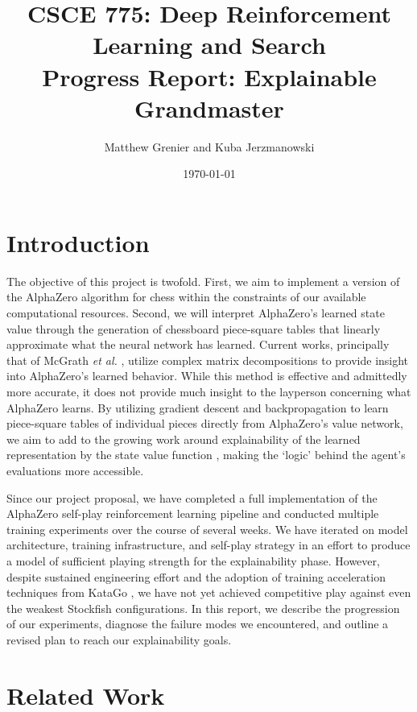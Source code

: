 \documentclass{article}
\title{CSCE 775: Deep Reinforcement Learning and Search \\
{\textbf{\large Progress Report: Explainable Grandmaster}}}
\author{Matthew Grenier and Kuba Jerzmanowski}
\date{\today}
\begin{document}
\maketitle

\section{Introduction}
\label{sec:introduction}

The objective of this project is twofold. First, we aim to implement a version of the AlphaZero \cite{silver2017mastering} algorithm for chess within the constraints of our available computational resources. Second, we will interpret AlphaZero's learned state value through the generation of chessboard piece-square tables that linearly approximate what the neural network has learned. Current works, principally that of McGrath \emph{et al.} \cite{mcgrath2022acquisition}, utilize complex matrix decompositions to provide insight into AlphaZero's learned behavior. While this method is effective and admittedly more accurate, it does not provide much insight to the layperson concerning what AlphaZero learns. By utilizing gradient descent and backpropagation to learn piece-square tables of individual pieces directly from AlphaZero's value network, we aim to add to the growing work around explainability of the learned representation by the state value function \cite{DBLP:journals/corr/ZahavyBM16}, making the `logic' behind the agent's evaluations more accessible.

Since our project proposal, we have completed a full implementation of the AlphaZero self-play reinforcement learning pipeline and conducted multiple training experiments over the course of several weeks. We have iterated on model architecture, training infrastructure, and self-play strategy in an effort to produce a model of sufficient playing strength for the explainability phase. However, despite sustained engineering effort and the adoption of training acceleration techniques from KataGo \cite{wu2019accelerating}, we have not yet achieved competitive play against even the weakest Stockfish configurations. In this report, we describe the progression of our experiments, diagnose the failure modes we encountered, and outline a revised plan to reach our explainability goals.

\section{Related Work}
\label{sec:related}
\end{document}

